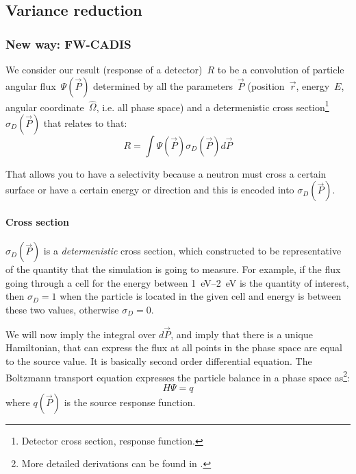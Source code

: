 \subsection{Variance reduction}

\subsubsection{New way: FW-CADIS}
We consider our result (response of a detector)~$R$ to be a convolution of particle angular
flux~$\Psi(\vec{P})$ determined by all the parameters~$\vec{P}$
(position~$\vec{r}$, energy~$E$, angular
coordinate~$\hat{\Omega}$, i.e. all phase space) and a determenistic cross
section\footnote{Detector cross section, response function.} %
$\sigma_D(\vec{P})$ that relates to that:
\begin{equation}
  \label{eq:vr:result}
  R = \int \Psi(\vec{P}) \sigma_D(\vec{P}) d\vec{P}
\end{equation}

That allows you to have a selectivity because a neutron must cross a
certain surface or have a certain energy or direction and this is encoded into $\sigma_D(\vec{P})$.

\paragraph{Cross section}
$\sigma_D(\vec{P})$ is a {\em determenistic} cross section, which constructed to be representative of the quantity
that the simulation is going to measure. For example, if the flux going through a cell for the energy between
\SIrange[range-phrase=\ and\ ]{1}{2}{\electronvolt} is the quantity of interest, then
$\sigma_D=1$ when the particle is located in the given cell and energy is between these two values,
otherwise $\sigma_D=0$.

\bigskip

We will now imply the integral over $d\vec{P}$, and imply that there is a unique Hamiltonian,
that can express the flux at all points in the phase space are equal to the source value. It is basically
second order differential equation. The Boltzmann transport equation expresses the particle balance in a phase space as\footnote{More detailed derivations can be found in \cite{Haghighat2003}.}:
\begin{equation}
  \label{eq:vr:Hamiltonian}
  H \Psi = q
\end{equation}
where $q(\vec{P})$ is the source response function.

